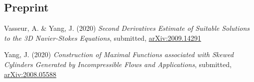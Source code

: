 \documentclass[margin,line]{res}
\newenvironment{list2}{
  \begin{list}{$\bullet$}{%
      \setlength{\itemsep}{0in}
      \setlength{\parsep}{0in} \setlength{\parskip}{0in}
      \setlength{\topsep}{0in} \setlength{\partopsep}{0in} 
      \setlength{\leftmargin}{0.2in}}}{\end{list}}
\begin{document}
\begin{resume}
\section{\sc Preprint}

\begin{etaremune}[leftmargin=0.02in, start=2]
    \item Vasseur, A. \& Yang, J. (2020) \textit{Second Derivatives Estimate of Suitable Solutions to the 3D Navier-Stokes Equations}, submitted, \href{https://arxiv.org/abs/2009.14291}{arXiv:2009.14291}
    \item Yang, J. (2020) \textit{Construction of Maximal Functions associated with Skewed Cylinders Generated by Incompressible Flows and Applications}, submitted, \href{https://arxiv.org/abs/2008.05588}{arXiv:2008.05588}
\end{etaremune}



\end{resume}
\end{document}
